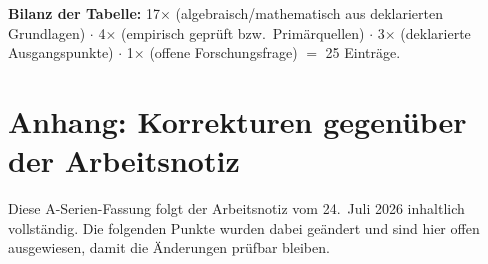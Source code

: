 \textbf{Bilanz der Tabelle:} 17$\times$ \LB (algebraisch/mathematisch aus
deklarierten Grundlagen) $\cdot$ 4$\times$ \LK (empirisch geprüft bzw.\
Primärquellen) $\cdot$ 3$\times$ \LS (deklarierte Ausgangspunkte) $\cdot$
1$\times$ \LH (offene Forschungsfrage) $=$ 25 Einträge.

\clearpage
{}
{}
\section*{Anhang: Korrekturen gegenüber der Arbeitsnotiz}
\label{sec:korr}

Diese A-Serien-Fassung folgt der Arbeitsnotiz vom 24.~Juli 2026 inhaltlich
vollständig. Die folgenden Punkte wurden dabei geändert und sind hier offen
ausgewiesen, damit die Änderungen prüfbar bleiben.

